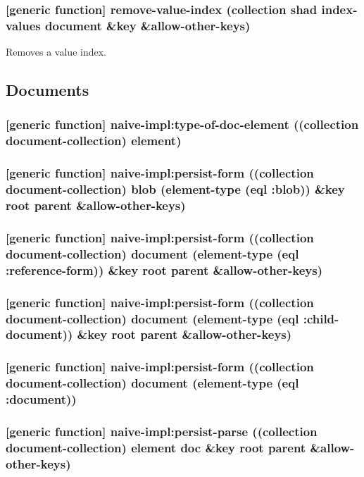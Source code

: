 \documentclass[11pt]{article}
\begin{document}
\subsubsection{[generic function] remove-value-index (collection shad index-values document \&key \&allow-other-keys)}
\label{sec:org3146b78}

Removes a value index.

\subsection{Documents}
\label{sec:org3c5ae6c}

\subsubsection{[generic function] naive-impl:type-of-doc-element ((collection document-collection) element)}
\label{sec:org2ef78d5}

\subsubsection{[generic function] naive-impl:persist-form ((collection document-collection) blob (element-type (eql :blob))			 \&key root parent \&allow-other-keys)}
\label{sec:org08574df}

\subsubsection{[generic function] naive-impl:persist-form ((collection document-collection) document (element-type (eql :reference-form)) \&key root parent \&allow-other-keys)}
\label{sec:org2fa3962}

\subsubsection{[generic function] naive-impl:persist-form ((collection document-collection) document (element-type (eql :child-document)) \&key root parent \&allow-other-keys)}
\label{sec:org171035b}

\subsubsection{[generic function] naive-impl:persist-form ((collection document-collection) document (element-type (eql :document))}
\label{sec:org98ec91d}

\subsubsection{[generic function] naive-impl:persist-parse ((collection document-collection) element doc \&key root parent \&allow-other-keys)}
\label{sec:org7e970e2}
\end{document}
